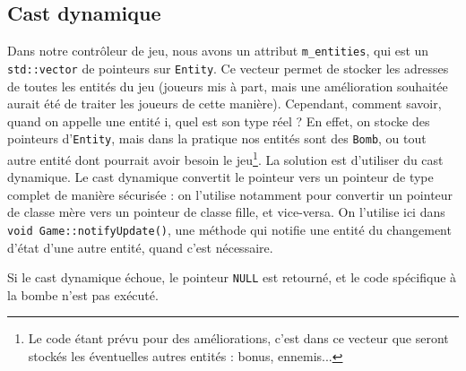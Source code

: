 \documentclass[a4paper,10pt]{report}
\begin{document}
\subsection{Cast dynamique}
Dans notre contrôleur de jeu, nous avons un attribut \texttt{m\_entities}, qui est un \texttt{std::vector} de pointeurs sur \texttt{Entity}. Ce vecteur permet de stocker les adresses de toutes les entités du jeu (joueurs mis à part, mais une amélioration souhaitée aurait été de traiter les joueurs de cette manière). Cependant, comment savoir, quand on appelle une entité i, quel est son type réel ? En effet, on stocke des pointeurs d'\texttt{Entity}, mais dans la pratique nos entités sont des \texttt{Bomb}, ou tout autre entité dont pourrait avoir besoin le jeu\footnote{Le code étant prévu pour des améliorations, c'est dans ce vecteur que seront stockés les éventuelles autres entités : bonus, ennemis...}. La solution est d'utiliser du cast dynamique. Le cast dynamique convertit le pointeur vers un pointeur de type complet de manière sécurisée : on l'utilise notamment pour convertir un pointeur de classe mère vers un pointeur de classe fille, et vice-versa. On l'utilise ici dans \texttt{void Game::notifyUpdate()}, une méthode qui notifie une entité du changement d'état d'une autre entité, quand c'est nécessaire.

Si le cast dynamique échoue, le pointeur \texttt{NULL} est retourné, et le code spécifique à la bombe n'est pas exécuté.
\end{document}
